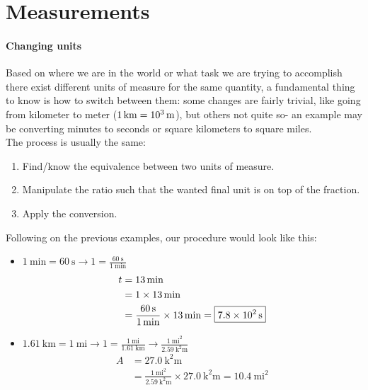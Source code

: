\section{Measurements}
\paragraph{Changing units} Based on where we are in the world or what task we are trying to accomplish there exist different units of measure for the same quantity, a fundamental thing to know is how to switch between them: some changes are fairly trivial, like going from kilometer to meter ($\SI{1}{\kilo\metre} = \SI{E3}{\metre}$), but others not quite so- an example may be converting minutes to seconds or square kilometers to square miles.\\
The process is usually the same:
\begin{enumerate}
    \item Find/know the equivalence between two units of measure.
    \item Manipulate the ratio such that the wanted final unit is on top of the fraction.
    \item Apply the conversion.
\end{enumerate}
Following on the previous examples, our procedure would look like this:
\begin{itemize}
    \item $\SI{1}{\minute}=\SI{60}{\second}\to 1=\frac{\SI{60}{\second}}{\SI{1}{\minute}}$
    \begin{align*}
        t&=\SI{13}{\minute}\\
        &=1\times\SI{13}{\minute}\\
        &=\frac{\SI{60}{\second}}{\SI{1}{\minute}}\times\SI{13}{\minute} = \boxed{\SI{7.8E2}{\second}}
    \end{align*}
    \item $\SI{1.61}{\kilo\metre} = \SI{1}{\mathrm{mi}}\to 1=\frac{\SI{1}{\mathrm{mi}}}{\SI{1.61}{\kilo\metre}}\to \frac{\SI{1}{\mathrm{mi}^2}}{\SI{2.59}{\square\kilo\metre}}$
    \begin{align*}
        A&=\SI{27.0}{\square\kilo\metre}\\
        &=\frac{\SI{1}{\mathrm{mi}^2}}{\SI{2.59}{\square\kilo\metre}}\times\SI{27.0}{\square\kilo\metre}= \boxed{\SI{10.4}{\mathrm{mi}^2}}
    \end{align*}
\end{itemize}
